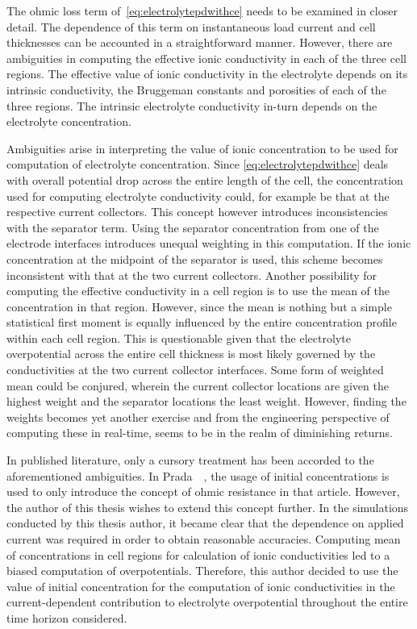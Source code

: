 The ohmic  loss term  of~\cref{eq:electrolytepdwithce} needs  to be  examined in
closer detail.  The dependence of  this term  on instantaneous load  current and
cell thicknesses  can be accounted  in a straightforward manner.  However, there
are ambiguities  in computing the  effective ionic  conductivity in each  of the
three cell regions. The effective value of ionic conductivity in the electrolyte
depends on its intrinsic conductivity, the Bruggeman constants and porosities of
each  of  the three  regions.  The  intrinsic electrolyte  conductivity  in-turn
depends on the electrolyte concentration.

Ambiguities   arise   in  interpreting   the   value   of  ionic   concentration
to   be    used   for   computation   of    electrolyte   concentration.   Since
\cref{eq:electrolytepdwithce}  deals  with  overall potential  drop  across  the
entire  length of  the cell,  the concentration  used for  computing electrolyte
conductivity could,  for example be  that at the respective  current collectors.
This concept however  introduces inconsistencies with the  separator term. Using
the  separator concentration  from one  of the  electrode interfaces  introduces
unequal  weighting  in this  computation.  If  the  ionic concentration  at  the
midpoint of the separator is used, this scheme becomes inconsistent with that at
the  two current  collectors. Another  possibility for  computing the  effective
conductivity in a  cell region is to  use the mean of the  concentration in that
region. However, since the mean is nothing but a simple statistical first moment
is  equally influenced  by the  entire  concentration profile  within each  cell
region. This is questionable given that the electrolyte overpotential across the
entire cell thickness  is most likely governed by the  conductivities at the two
current  collector interfaces.  Some form  of weighted  mean could  be conjured,
wherein the  current collector locations  are given  the highest weight  and the
separator locations the  least weight. However, finding the  weights becomes yet
another  exercise and  from the  engineering perspective  of computing  these in
real-time, seems to be in the realm of diminishing returns.

In  published  literature,  only  a  cursory  treatment  has  been  accorded  to
the  aforementioned  ambiguities.  In  Prada~\etal~\cite{Prada2012},  the  usage
of  initial concentrations  is  used  to only  introduce  the  concept of  ohmic
resistance  in that  article.  However,  the author  of  this  thesis wishes  to
extend  this  concept further.  In  the  simulations  conducted by  this  thesis
author, it  became clear  that the  dependence on  applied current  was required
in  order to  obtain  reasonable accuracies.  Computing  mean of  concentrations
in  cell  regions for  calculation  of  ionic  conductivities  led to  a  biased
computation of overpotentials.  Therefore, this author decided to  use the value
of  initial concentration  for the  computation of  ionic conductivities  in the
current-dependent  contribution  to  electrolyte  overpotential  throughout  the
entire time horizon considered.

